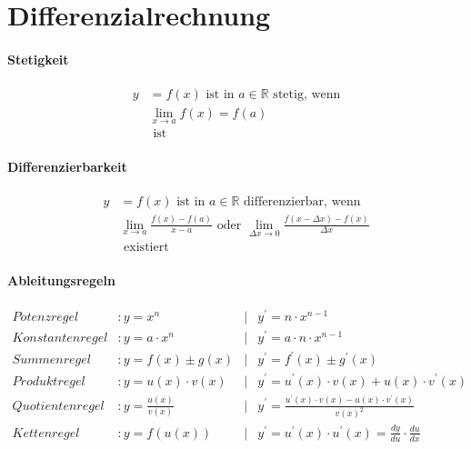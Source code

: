 \section{Differenzialrechnung}
\paragraph{Stetigkeit}
\begin{align*}
    y &= f(x) \textrm{ ist in } a \in\mathbb{R} \textrm{ stetig, wenn}\\
    & \lim_{x \to a} f(x) = f(a) \\
    & \textrm{ ist}
\end{align*}

\paragraph{Differenzierbarkeit}
\begin{align*}
    y &= f(x) \textrm{ ist in } a \in\mathbb{R} \textrm{ differenzierbar, wenn}\\
   & \lim_{x \to a} \frac{f(x)-f(a)}{x-a} \textrm{ oder } \lim_{\Delta x \to 0} \frac{f(x-\Delta x) -f (x)}{\Delta x}\\
   & \textrm{ existiert}
\end{align*}

\paragraph{Ableitungsregeln}
\begin{align*}
    Potenzregel &: y= x^n                   &| &y^{\prime} = n \cdot x^{n-1} \\
    Konstantenregel &: y= a \cdot x^n       &| &y^{\prime} = a \cdot n \cdot x^{n-1} \\
    Summenregel &: y= f(x) \pm g(x)         &| &y^{\prime} = f^{\prime}(x) \pm g^{\prime}(x) \\
    Produktregel &: y= u(x) \cdot v(x)      &| &y^{\prime} = u^{\prime}(x) \cdot v(x) + u(x) \cdot v^{\prime}(x)\\
    Quotientenregel &: y= \frac{u(x)}{v(x)} &| &y^{\prime} = \frac{u^{\prime}(x) \cdot v(x) - u(x) \cdot v^{\prime}(x)}{v(x)^2}\\
    Kettenregel &: y= f(u(x))               &| &y^{\prime} = u^{\prime}(x) \cdot u^{\prime}(x) = \frac{dy}{du} \cdot \frac{du}{dx} \\
\end{align*}

